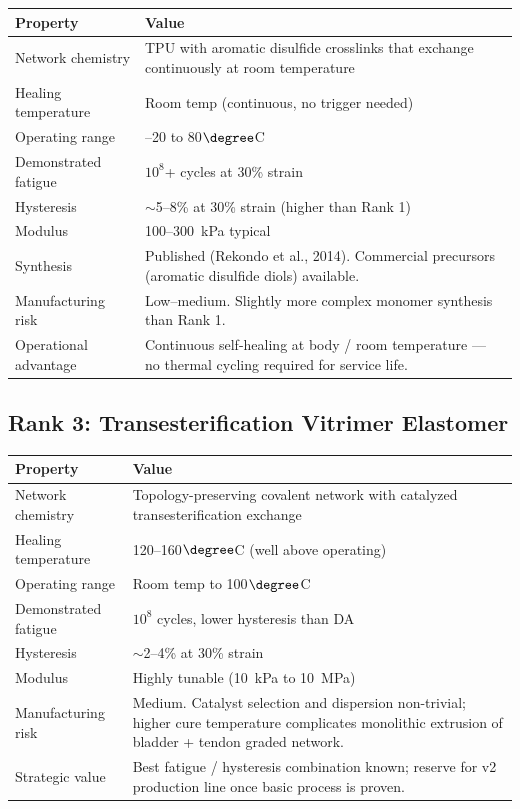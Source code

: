\documentclass[11pt, a4paper]{article}
\begin{document}
\begin{center}
\begin{tabular}{@{}lp{9cm}@{}}
\toprule
\textbf{Property} & \textbf{Value} \\
\midrule
Network chemistry & TPU with aromatic disulfide crosslinks that
  exchange continuously at room temperature \\
Healing temperature & Room temp (continuous, no trigger needed) \\
Operating range & --20 to 80$\degree$C \\
Demonstrated fatigue & $10^8$+ cycles at 30\% strain \\
Hysteresis & $\sim$5--8\% at 30\% strain
  \textcolor{nm-orange}{(higher than Rank 1)} \\
Modulus & 100--300~kPa typical \\
Synthesis & Published (Rekondo et al., 2014). Commercial
  precursors (aromatic disulfide diols) available.\\
\midrule
Manufacturing risk & \textcolor{nm-green}{Low--medium.} Slightly
  more complex monomer synthesis than Rank 1. \\
Operational advantage & \textcolor{nm-green}{Continuous
  self-healing at body / room temperature --- no thermal cycling
  required for service life.} \\
\bottomrule
\end{tabular}
\end{center}

\subsection{Rank 3: Transesterification Vitrimer Elastomer}

\begin{center}
\begin{tabular}{@{}lp{9cm}@{}}
\toprule
\textbf{Property} & \textbf{Value} \\
\midrule
Network chemistry & Topology-preserving covalent network with
  catalyzed transesterification exchange \\
Healing temperature & 120--160$\degree$C (well above operating) \\
Operating range & Room temp to 100$\degree$C \\
Demonstrated fatigue & $10^8$ cycles, lower hysteresis than DA \\
Hysteresis & $\sim$2--4\% at 30\% strain \\
Modulus & Highly tunable (10~kPa to 10~MPa) \\
\midrule
Manufacturing risk & \textcolor{nm-orange}{Medium.} Catalyst
  selection and dispersion non-trivial; higher cure temperature
  complicates monolithic extrusion of bladder + tendon graded
  network. \\
Strategic value & \textcolor{nm-green}{Best fatigue / hysteresis
  combination known; reserve for v2 production line once basic
  process is proven.} \\
\bottomrule
\end{tabular}
\end{center}
\end{document}
